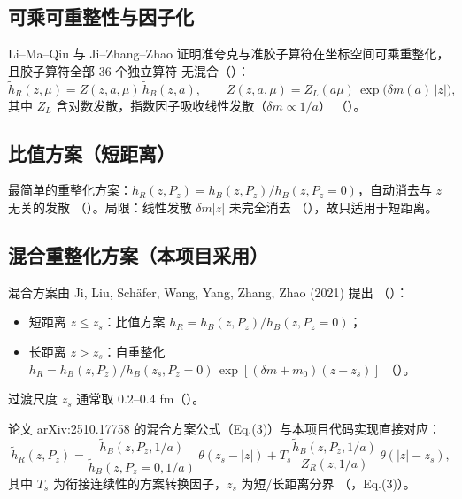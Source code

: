 \documentclass[UTF8]{ctexart}
\begin{document}
\subsection{可乘可重整性与因子化}

Li--Ma--Qiu 与 Ji--Zhang--Zhao 证明准夸克与准胶子算符在坐标空间可乘重整化，且胶子算符全部 36 个独立算符
无混合（\texttt{}）：
\begin{equation}
  \tilde h_R(z,\mu) = Z(z,a,\mu)\, \tilde h_B(z,a), \qquad
  Z(z,a,\mu) = Z_L(a\mu)\,\exp\!\big(\delta m(a)\,|z|\big),
\end{equation}
其中 $Z_L$ 含对数发散，指数因子吸收线性发散（$\delta m \propto 1/a$）
（\texttt{}）。

\subsection{比值方案（短距离）}

最简单的重整化方案：$h_R(z,P_z) = h_B(z,P_z)/h_B(z,P_z=0)$，自动消去与 $z$ 无关的发散
（\texttt{}）。局限：线性发散 $\delta m |z|$ 未完全消去
（\texttt{}），故只适用于短距离。

\subsection{混合重整化方案（本项目采用）}

混合方案由 Ji, Liu, Sch\"afer, Wang, Yang, Zhang, Zhao (2021) 提出
（\texttt{}）：
\begin{itemize}
  \item 短距离 $z \le z_s$：比值方案 $h_R = h_B(z,P_z)/h_B(z,P_z{=}0)$；
  \item 长距离 $z > z_s$：自重整化 $h_R = h_B(z,P_z)/h_B(z_s,P_z{=}0)\,\exp[(\delta m + m_0)(z - z_s)]$
        （\texttt{}）。
\end{itemize}
过渡尺度 $z_s$ 通常取 $0.2$--$0.4$ fm（\texttt{}）。

论文 arXiv:2510.17758 的混合方案公式（Eq.(3)）与本项目代码实现直接对应：
\begin{equation}
  \tilde h_R(z,P_z) = \frac{\tilde h_B(z,P_z,1/a)}{\tilde h_B(z,P_z{=}0,1/a)}\,\theta(z_s-|z|)
    + T_s \frac{\tilde h_B(z,P_z,1/a)}{Z_R(z,1/a)}\,\theta(|z|-z_s),
\end{equation}
其中 $T_s$ 为衔接连续性的方案转换因子，$z_s$ 为短/长距离分界
（\texttt{}，Eq.(3)）。
\end{document}
